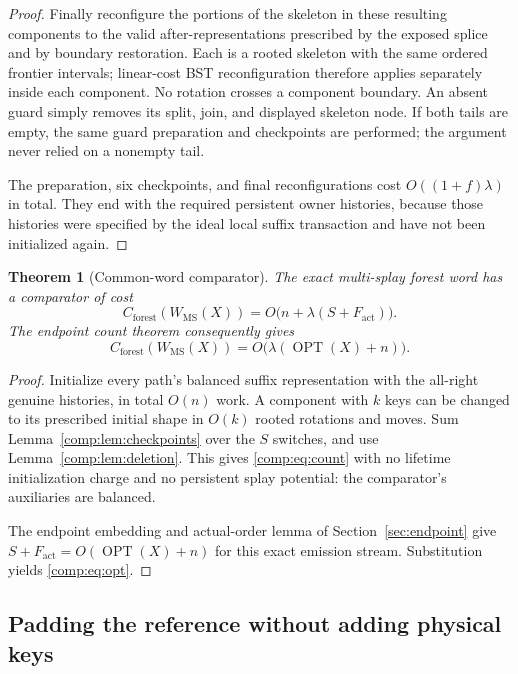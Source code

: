 \documentclass[11pt]{article}
\numberwithin{equation}{section}
\newtheorem{theorem}{Theorem}[section]
\newcommand{\OPT}{\operatorname{OPT}}
\newcommand{\MS}{\mathrm{MS}}
\begin{document}
\begin{proof}
Finally reconfigure the portions of the skeleton in these resulting
components to the valid after-representations prescribed by the
exposed splice and by boundary restoration. Each is a rooted skeleton
with the same ordered frontier intervals; linear-cost BST reconfiguration
therefore applies separately inside each component. No rotation crosses
a component boundary. An absent guard simply removes its split, join,
and displayed skeleton node. If both tails are empty, the same
guard preparation and checkpoints are performed; the argument never
relied on a nonempty tail.

The preparation, six checkpoints, and final reconfigurations cost
$O((1+f)\lambda)$ in total. They end with the required persistent owner
histories, because those histories were specified by the ideal local
suffix transaction and have not been initialized again.
\end{proof}

\begin{theorem}[Common-word comparator]\label{comp:thm:comparator}
The exact multi-splay forest word has a comparator of cost
\begin{equation}\label{comp:eq:count}
C_{\mathrm{forest}}(W_{\MS}(X))
   =O\bigl(n+\lambda(S+F_{\mathrm{act}})\bigr).
\end{equation}
The endpoint count theorem consequently gives
\begin{equation}\label{comp:eq:opt}
C_{\mathrm{forest}}(W_{\MS}(X))
   =O\bigl(\lambda(\OPT(X)+n)\bigr).
\end{equation}
\end{theorem}

\begin{proof}
Initialize every path's balanced suffix representation with the
all-right genuine histories, in total $O(n)$ work. A component with
$k$ keys can be changed to its prescribed initial shape in $O(k)$
rooted rotations and moves. Sum Lemma~\ref{comp:lem:checkpoints} over the
$S$ switches, and use Lemma~\ref{comp:lem:deletion}. This gives \eqref{comp:eq:count} with
no lifetime initialization charge and no persistent splay potential:
the comparator's auxiliaries are balanced.

The endpoint embedding and actual-order lemma of Section~\ref{sec:endpoint} give
$S+F_{\mathrm{act}}=O(\OPT(X)+n)$ for this exact emission stream.
Substitution yields \eqref{comp:eq:opt}.
\end{proof}

\subsection{Padding the reference without adding physical keys}
\end{document}
